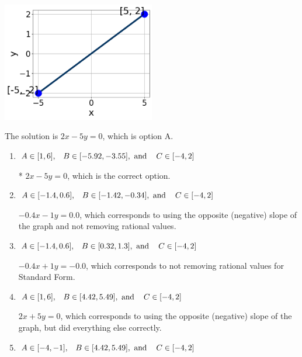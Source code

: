 \documentclass{extbook}[14pt]
\begin{document}
\begin{enumerate}
{\begin{center}
    \includegraphics[width=0.5\textwidth]{../Figures/linearGraphToStandardCopyA.png}
\end{center}




The solution is \( 2x - 5y = 0 \), which is option A.\begin{enumerate}[label=\Alph*.]
\item \( A \in [1, 6], \hspace{3mm} B \in [-5.92, -3.55], \text{ and } \hspace{3mm} C \in [-4, 2] \)

* $2x - 5y = 0$, which is the correct option.
\item \( A \in [-1.4, 0.6], \hspace{3mm} B \in [-1.42, -0.34], \text{ and } \hspace{3mm} C \in [-4, 2] \)

 $-0.4x - 1y = 0.0$, which corresponds to using the opposite (negative) slope of the graph and not removing rational values.
\item \( A \in [-1.4, 0.6], \hspace{3mm} B \in [0.32, 1.3], \text{ and } \hspace{3mm} C \in [-4, 2] \)

 $-0.4x + 1y = -0.0$, which corresponds to not removing rational values for Standard Form.
\item \( A \in [1, 6], \hspace{3mm} B \in [4.42, 5.49], \text{ and } \hspace{3mm} C \in [-4, 2] \)

 $2x + 5y = 0$, which corresponds to using the opposite (negative) slope of the graph, but did everything else correctly.
\item \( A \in [-4, -1], \hspace{3mm} B \in [4.42, 5.49], \text{ and } \hspace{3mm} C \in [-4, 2] \)


\end{enumerate}}
\end{enumerate}
\end{document}
